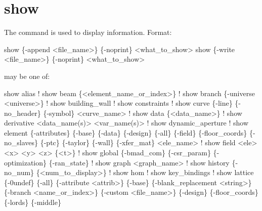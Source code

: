 {{{{\section{show}
\label{s:show}

The  command is used to display information.
Format:
\begin{example}
  show \{-append <file_name>\} \{-noprint\} <what_to_show>
  show \{-write <file_name>\} \{-noprint\} <what_to_show>
\end{example}

 may be one of:
\begin{example}
  show alias                                                            ! 
  show beam \{<element_name_or_index>\}                                   ! 
  show branch \{-universe <universe>\}                                    ! 
  show building_wall                                                    ! 
  show constraints                                                      ! 
  show curve \{-line\} \{-no_header\} \{-symbol\} <curve_name>                ! 
  show data \{<data_name>\}                                               ! 
  show derivative <data_name(s)> <var_name(s)>                          ! 
  show dynamic_aperture                                                 ! 
  show element \{-attributes\} \{-base\} \{-data\} \{-design\} \{-all\} \{-field\} 
        \{-floor_coords\} \{-no_slaves\} \{-ptc\} \{-taylor\} \{-wall\} 
        \{-xfer_mat\} <ele_name>                                          ! 
  show field <ele> <x> <y> <z> \{<t>\}                                    ! 
  show global \{-bmad_com\} \{-csr_param\} \{-optimization\} \{-ran_state\}     ! 
  show graph <graph_name>                                             ! 
  show history \{-no_num\} \{<num_to_display>\}                             ! 
  show hom                                                              ! 
  show key_bindings                                                     ! 
  show lattice \{-0undef\} \{-all\} \{-attribute <attrib>\} \{-base\} 
        \{-blank_replacement <string>\} \{-branch <name_or_index>\} 
        \{-custom <file_name>\} \{-design\} \{-floor_coords\} \{-lords\} \{-middle\} 

\end{example}}}}}
